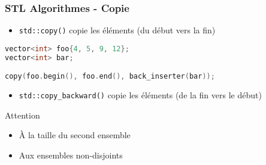 \documentclass[C++.tex]{subfiles}
\begin{document}
\begin{frame}[fragile]
	\frametitle{STL Algorithmes - Copie}
	\begin{itemize}
		\item \lstinline|std::copy()| copie les éléments (du début vers la fin)
	\end{itemize}

	\begin{lstlisting}[language=C++]
vector<int> foo{4, 5, 9, 12};
vector<int> bar;

copy(foo.begin(), foo.end(), back_inserter(bar));\end{lstlisting}


	\begin{itemize}
		\item \lstinline|std::copy_backward()| copie les éléments (de la fin vers le début)
	\end{itemize}


	\begin{alertblock}{Attention}
		\begin{itemize}
			\item À la taille du second ensemble


			\item Aux ensembles non-disjoints

		\end{itemize}
	\end{alertblock}
\end{frame}
\end{document}
